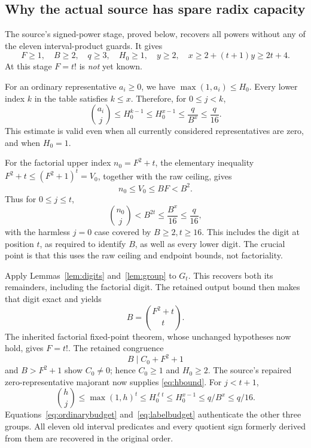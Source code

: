 \documentclass[11pt,letterpaper]{article}
\theoremstyle{definition}\newtheorem{definition}[theorem]{Definition}
\theoremstyle{remark}\newtheorem{remark}[theorem]{Remark}
\begin{document}
\subsection{Why the actual source has spare radix capacity}
The source's signed-power stage, proved below, recovers all powers without any of the eleven interval-product guards. It gives
\[
 F\ge1,\quad B\ge2,\quad q\ge3,\quad H_0\ge1,
 \quad y\ge2,\quad x\ge2+(t+1)y\ge2t+4.
\]
At this stage \(F=t!\) is \emph{not} yet known.

For an ordinary representative \(a_i\ge0\), we have
\(\max(1,a_i)\le H_0\). Every lower index \(k\) in the table satisfies \(k\le x\). Therefore, for \(0\le j<k\),
\begin{equation}\label{eq:ordinarybudget}
 \binom{a_i}{j}\le H_0^{k-1}\le H_0^{x-1}
 \le \frac{q}{B^x}\le\frac q{16}.
\end{equation}
This estimate is valid even when all currently considered representatives are zero, and when \(H_0=1\).

For the factorial upper index \(n_0=F^2+t\), the elementary inequality
\(F^2+t\le(F^2+1)^t=V_0\), together with the raw ceiling, gives
\[
 n_0\le V_0\le BF<B^2.
\]
Thus for \(0\le j\le t\),
\begin{equation}\label{eq:factorialbudget}
 \binom{n_0}{j}<B^{2t}
 \le\frac{B^x}{16}\le\frac q{16},
\end{equation}
with the harmless \(j=0\) case covered by \(B\ge2,t\ge16\). This includes the digit at position \(t\), as required to identify \(B\), as well as every lower digit. The crucial point is that this uses the raw ceiling and endpoint bounds, not factoriality.

Apply Lemmas~\ref{lem:digits} and~\ref{lem:group} to \(G_t\). This recovers both its remainders, including the factorial digit. The retained output bound then makes that digit exact and yields
\[
 B=\binom{F^2+t}{t}.
\]
The inherited factorial fixed-point theorem, whose unchanged hypotheses now hold, gives \(F=t!\). The retained congruence
\[
 B\mid C_0+F^2+1
\]
and \(B>F^2+1\) show \(C_0\ne0\); hence \(C_0\ge1\) and \(H_0\ge2\). The source's repaired zero-representative majorant now supplies \eqref{eq:hbound}. For \(j<t+1\),
\begin{equation}\label{eq:labelbudget}
 \binom hj\le\max(1,h)^t\le H_0^{\ell t}
 \le H_0^{x-1}\le q/B^x\le q/16.
\end{equation}
Equations~\eqref{eq:ordinarybudget} and~\eqref{eq:labelbudget} authenticate the other three groups. All eleven old interval predicates and every quotient sign formerly derived from them are recovered in the original order.
\end{document}
